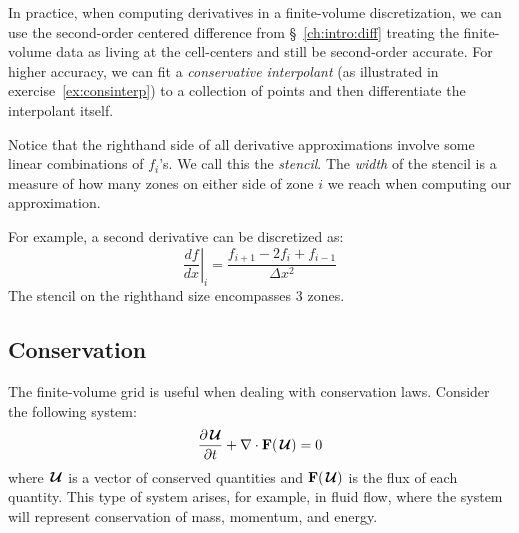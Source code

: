In practice, when computing derivatives in a finite-volume
discretization, we can use the second-order centered difference from
\S~\ref{ch:intro:diff} treating the finite-volume data as living at the
cell-centers and still be second-order accurate.  For higher accuracy,
we can fit a {\em conservative interpolant} (as illustrated in
exercise~\ref{ex:consinterp}) to a collection of points and then
differentiate the interpolant itself.  

Notice that the righthand side of all derivative approximations involve
some linear combinations of $f_i$'s.  We call this the {\em stencil}.
The {\em width} of the stencil is a measure of how many zones on
either side of zone $i$ we reach when computing our approximation.

For example, a second derivative can be discretized as:
\begin{equation}
\left . \frac{df}{dx} \right |_i = \frac{f_{i+1} - 2 f_i + f_{i-1}}{\Delta x^2}
\end{equation}
The stencil on the righthand size encompasses 3 zones.

\subsection{Conservation}

The finite-volume grid is useful when dealing with conservation laws.
Consider the following system:
\begin{equation}
\frac{\partial {\,\boldsymbol{\mathcal{U}}}}{\partial t} + \nabla \cdot {\bf F}({\,\boldsymbol{\mathcal{U}}}) = 0
\end{equation}
where ${\,\boldsymbol{\mathcal{U}}}$ is a vector of conserved quantities and ${\bf F}({\,\boldsymbol{\mathcal{U}}})$ is the flux
of each quantity.  This type of system arises, for example, in fluid
flow, where the system will represent conservation of mass, momentum,
and energy.

